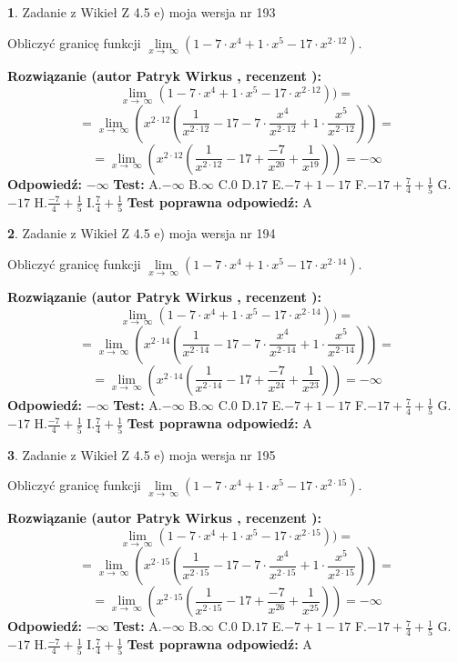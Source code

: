 \documentclass[12pt, a4paper]{article}
\theoremstyle{definition} %
\newtheorem{zad}{}
\newcommand{\zadStart}[1]{\begin{zad}#1\newline}
\newcommand{\zadStop}{\end{zad}}
\newcommand{\rozwStart}[2]{\noindent \textbf{Rozwiązanie (autor #1 , recenzent #2): }\newline}
\newcommand{\rozwStop}{\newline}
\newcommand{\odpStart}{\noindent \textbf{Odpowiedź:}\newline}
\newcommand{\odpStop}{\newline}
\newcommand{\testStart}{\noindent \textbf{Test:}\newline}
\newcommand{\testStop}{\newline}
\newcommand{\kluczStart}{\noindent \textbf{Test poprawna odpowiedź:}\newline}
\newcommand{\kluczStop}{\newline}
\begin{document}
\zadStart{Zadanie z Wikieł Z 4.5 e) moja wersja nr 193}



Obliczyć granicę funkcji  $\lim\limits_{x\to\ \infty}(1 - 7 \cdot x^{4}+1 \cdot x^{5}- 17 \cdot x^{2\cdot12})$.
\zadStop
\rozwStart{Patryk Wirkus}{}
$$\lim\limits_{x\to\ \infty}(1 - 7 \cdot x^{4}+1 \cdot x^{5}- 17 \cdot x^{2\cdot12}))=$$
$$=\lim\limits_{x\to\ \infty}(x^{2\cdot12}(\frac{1}{x^{2\cdot12}}-17 -7 \cdot \frac{x^{4}}{x^{2\cdot12}}+1 \cdot \frac{x^{5}}{x^{2\cdot12}}))=$$
$$=\lim\limits_{x\to\ \infty}(x^{2\cdot12}(\frac{1}{x^{2\cdot12}}-17 + \frac{-7}{x^{20}}+ \frac{1}{x^{19}}))=-\infty$$
\rozwStop
\odpStart
$-\infty$
\odpStop
\testStart
A.$-\infty$ B.$\infty$ C.$0$ D.$17$ E.$-7 + 1 - 17$
F.$-17+\frac{7}{4}+\frac{1}{5}$ G.$-17$
H.$\frac{-7}{4}+\frac{1}{5}$
I.$\frac{7}{4}+\frac{1}{5}$
\testStop
\kluczStart
A
\kluczStop



\zadStart{Zadanie z Wikieł Z 4.5 e) moja wersja nr 194}



Obliczyć granicę funkcji  $\lim\limits_{x\to\ \infty}(1 - 7 \cdot x^{4}+1 \cdot x^{5}- 17 \cdot x^{2\cdot14})$.
\zadStop
\rozwStart{Patryk Wirkus}{}
$$\lim\limits_{x\to\ \infty}(1 - 7 \cdot x^{4}+1 \cdot x^{5}- 17 \cdot x^{2\cdot14}))=$$
$$=\lim\limits_{x\to\ \infty}(x^{2\cdot14}(\frac{1}{x^{2\cdot14}}-17 -7 \cdot \frac{x^{4}}{x^{2\cdot14}}+1 \cdot \frac{x^{5}}{x^{2\cdot14}}))=$$
$$=\lim\limits_{x\to\ \infty}(x^{2\cdot14}(\frac{1}{x^{2\cdot14}}-17 + \frac{-7}{x^{24}}+ \frac{1}{x^{23}}))=-\infty$$
\rozwStop
\odpStart
$-\infty$
\odpStop
\testStart
A.$-\infty$ B.$\infty$ C.$0$ D.$17$ E.$-7 + 1 - 17$
F.$-17+\frac{7}{4}+\frac{1}{5}$ G.$-17$
H.$\frac{-7}{4}+\frac{1}{5}$
I.$\frac{7}{4}+\frac{1}{5}$
\testStop
\kluczStart
A
\kluczStop



\zadStart{Zadanie z Wikieł Z 4.5 e) moja wersja nr 195}



Obliczyć granicę funkcji  $\lim\limits_{x\to\ \infty}(1 - 7 \cdot x^{4}+1 \cdot x^{5}- 17 \cdot x^{2\cdot15})$.
\zadStop
\rozwStart{Patryk Wirkus}{}
$$\lim\limits_{x\to\ \infty}(1 - 7 \cdot x^{4}+1 \cdot x^{5}- 17 \cdot x^{2\cdot15}))=$$
$$=\lim\limits_{x\to\ \infty}(x^{2\cdot15}(\frac{1}{x^{2\cdot15}}-17 -7 \cdot \frac{x^{4}}{x^{2\cdot15}}+1 \cdot \frac{x^{5}}{x^{2\cdot15}}))=$$
$$=\lim\limits_{x\to\ \infty}(x^{2\cdot15}(\frac{1}{x^{2\cdot15}}-17 + \frac{-7}{x^{26}}+ \frac{1}{x^{25}}))=-\infty$$
\rozwStop
\odpStart
$-\infty$
\odpStop
\testStart
A.$-\infty$ B.$\infty$ C.$0$ D.$17$ E.$-7 + 1 - 17$
F.$-17+\frac{7}{4}+\frac{1}{5}$ G.$-17$
H.$\frac{-7}{4}+\frac{1}{5}$
I.$\frac{7}{4}+\frac{1}{5}$
\testStop
\kluczStart
A
\kluczStop
\end{document}
